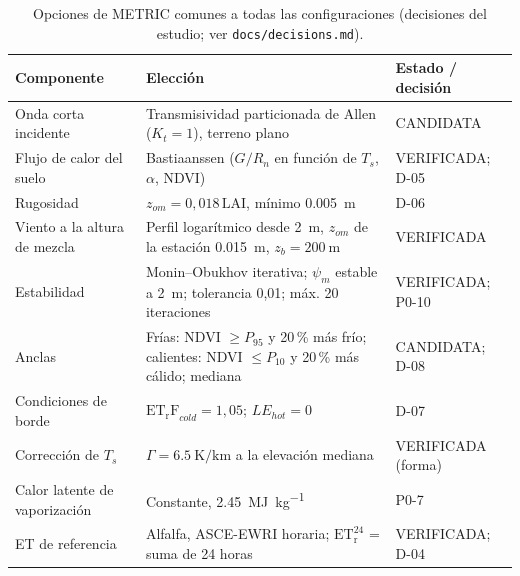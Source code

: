 \begin{table}[htbp]
\centering\footnotesize
\caption{Opciones de METRIC comunes a todas las configuraciones (decisiones
del estudio; ver \texttt{docs/decisions.md}).}\label{tab:options}
\begin{tabularx}{\textwidth}{>{\raggedright\arraybackslash}p{4.3cm}>{\raggedright\arraybackslash}X>{\raggedright\arraybackslash}p{2.6cm}}
\toprule
Componente & Elección & Estado / decisión \\
\midrule
Onda corta incidente & Transmisividad particionada de Allen ($K_t = 1$), terreno plano & CANDIDATA \\
Flujo de calor del suelo & Bastiaanssen ($G/R_n$ en función de $T_s$, $\alpha$, NDVI) & VERIFICADA; D-05 \\
Rugosidad & $z_{om} = 0{,}018\,\mathrm{LAI}$, mínimo \SI{0,005}{\metre} & D-06 \\
Viento a la altura de mezcla & Perfil logarítmico desde \SI{2}{\metre}, $z_{om}$ de la estación \SI{0,015}{\metre}, $z_b = \SI{200}{\metre}$ & VERIFICADA \\
Estabilidad & Monin--Obukhov iterativa; $\psi_m$ estable a \SI{2}{\metre}; tolerancia 0,01; máx. 20 iteraciones & VERIFICADA; P0-10 \\
Anclas & Frías: NDVI $\ge P_{95}$ y 20\,\% más frío; calientes: NDVI $\le P_{10}$ y 20\,\% más cálido; mediana & CANDIDATA; D-08 \\
Condiciones de borde & $\mathrm{ET_rF}_{cold} = 1{,}05$; $LE_{hot} = 0$ & D-07 \\
Corrección de $T_s$ & $\Gamma = \SI{6,5}{\kelvin\per\kilo\metre}$ a la elevación mediana & VERIFICADA (forma) \\
Calor latente de vaporización & Constante, \SI{2,45}{\mega\joule\per\kilo\gram} & P0-7 \\
ET de referencia & Alfalfa, ASCE-EWRI horaria; $\mathrm{ET_r^{24}}$ = suma de 24 horas & VERIFICADA; D-04 \\
\bottomrule
\end{tabularx}
\end{table}


